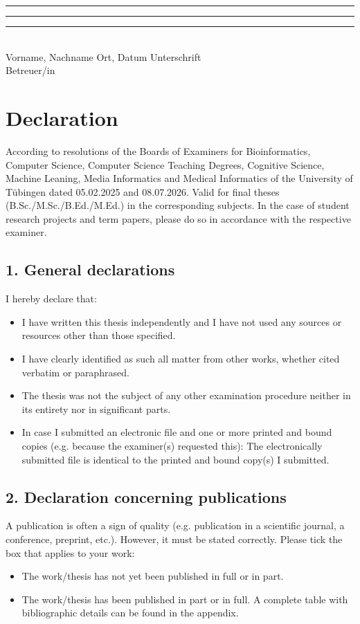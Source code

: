 {        \vspace{1.5cm}
        \noindent
        \rule{5cm}{0.4pt} \hfill \rule{4cm}{0.4pt} \hfill \rule{5cm}{0.4pt} \\
        Vorname, Nachname \hfill Ort, Datum \hfill Unterschrift \\
        Betreuer/in
    \else
        \section*{Declaration}
        \small
        According to resolutions of the Boards of Examiners for Bioinformatics, Computer Science, Computer Science Teaching Degrees, Cognitive Science, Machine Leaning, Media Informatics and Medical Informatics of the University of Tübingen dated 05.02.2025 and 08.07.2026. Valid for final theses (B.Sc./M.Sc./B.Ed./M.Ed.) in the corresponding subjects. In the case of student research projects and term papers, please do so in accordance with the respective examiner.

        \subsection*{1. General declarations}
        I hereby declare that:
        \begin{itemize}
            \item I have written this thesis independently and I have not used any sources or resources other than those specified.
            \item I have clearly identified as such all matter from other works, whether cited verbatim or paraphrased.
            \item The thesis was not the subject of any other examination procedure neither in its entirety nor in significant parts.
            \item In case I submitted an electronic file and one or more printed and bound copies (e.g. because the examiner(s) requested this): The electronically submitted file is identical to the printed and bound copy(s) I submitted.
        \end{itemize}

        \subsection*{2. Declaration concerning publications}
        A publication is often a sign of quality (e.g. publication in a scientific journal, a conference, preprint, etc.). However, it must be stated correctly. Please tick the box that applies to your work:
        \begin{itemize}
            \item[$\square$] The work/thesis has not yet been published in full or in part.
            \item[$\square$] The work/thesis has been published in part or in full. A complete table with bibliographic details can be found in the appendix.
        \end{itemize}

}
